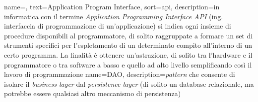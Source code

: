 
\renewcommand{\acronymname}{Acronimi e abbreviazioni}

















{
    name=,
    text=Application Program Interface,
    sort=api,
    description={in informatica con il termine \emph{Application Programming Interface API} (ing. interfaccia di programmazione di un'applicazione) si indica ogni insieme di procedure disponibili al programmatore, di solito raggruppate a formare un set di strumenti specifici per l'espletamento di un determinato compito all'interno di un certo programma. La finalità è ottenere un'astrazione, di solito tra l'hardware e il programmatore o tra software a basso e quello ad alto livello semplificando così il lavoro di programmazione}
}
{
    name=DAO,
    description={\textit{pattern} che consente di isolare il \textit{business layer} dal \textit{persistence layer} (di solito un database relazionale, ma potrebbe essere qualsiasi altro meccanismo di persistenza)}
}

